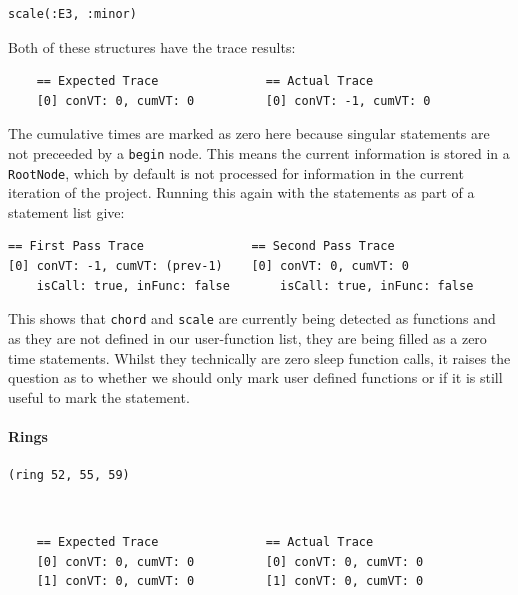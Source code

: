 \documentclass[11pt, abstracton, twoside, titlepage=true]{scrartcl}
\begin{document}
\begin{minipage}{\textwidth}
	\begin{lstlisting}[style = sonicpi]
      scale(:E3, :minor)
	\end{lstlisting}
\end{minipage}

Both of these structures have the trace results:
\\
\begin{lstlisting}
    == Expected Trace               == Actual Trace
    [0] conVT: 0, cumVT: 0          [0] conVT: -1, cumVT: 0
\end{lstlisting}

The cumulative times are marked as zero here 
because singular statements are not preceeded by a \texttt{begin} node. This means 
the current information is stored in a \texttt{RootNode}, which by default is 
not processed for information in the current iteration of the project. Running this
again with the statements as part of a statement list give:
\\
\begin{lstlisting}
== First Pass Trace               == Second Pass Trace
[0] conVT: -1, cumVT: (prev-1)    [0] conVT: 0, cumVT: 0
    isCall: true, inFunc: false       isCall: true, inFunc: false
\end{lstlisting}

This shows that \texttt{chord} and \texttt{scale} are currently being detected 
as functions and as they are not defined in our user-function list, they are being 
filled as a zero time statements. Whilst they technically are zero sleep function 
calls, it raises the question as to whether we should only mark user defined 
functions or if it is still useful to mark the statement. 

\paragraph{Rings}
\begin{minipage}{\textwidth}
	\begin{lstlisting}[style = sonicpi]
      (ring 52, 55, 59)
	\end{lstlisting}
\end{minipage}
\\
\begin{lstlisting}
    == Expected Trace               == Actual Trace
    [0] conVT: 0, cumVT: 0          [0] conVT: 0, cumVT: 0
    [1] conVT: 0, cumVT: 0          [1] conVT: 0, cumVT: 0
\end{lstlisting}
\end{document}
